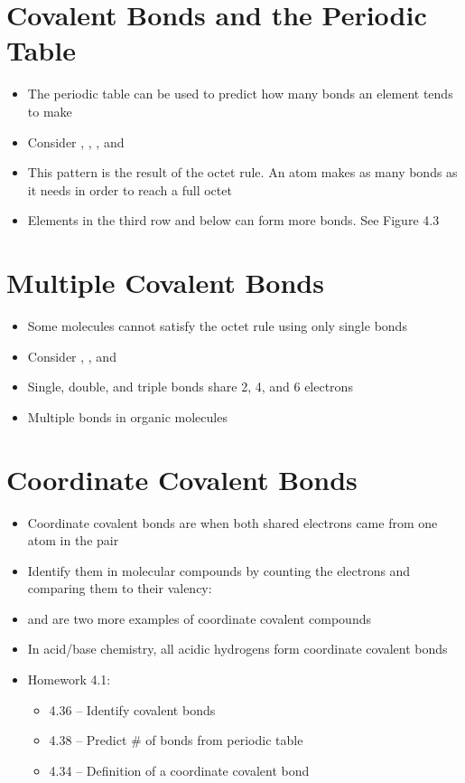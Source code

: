 \documentclass[12pt, openany, letterpaper]{memoir}
\begin{document}
\section{Covalent Bonds and the Periodic Table}
\begin{itemize}
	\item The periodic table can be used to predict how many bonds an element tends to make
	\item Consider , , , and 
	\item This pattern is the result of the octet rule. An atom makes as many bonds as it needs in order to reach a full octet
	\item Elements in the third row and below can form more bonds. See Figure 4.3	
\end{itemize}
\section{Multiple Covalent Bonds}
\begin{itemize}
	\item Some molecules cannot satisfy the octet rule using only single bonds
	\item Consider , , and 
	\item Single, double, and triple bonds share 2, 4, and 6 electrons
	\item Multiple bonds in organic molecules
\end{itemize}
\section{Coordinate Covalent Bonds}
\begin{itemize}
	\item Coordinate covalent bonds are when both shared electrons came from one atom in the pair
	\item Identify them in molecular compounds by counting the electrons and comparing them to their valency: 
	\item {} and  are two more examples of coordinate covalent compounds
	\item In acid/base chemistry, all acidic hydrogens form coordinate covalent bonds
	\item Homework 4.1:
	\begin{itemize}
		\item 4.36 -- Identify covalent bonds
		\item 4.38 -- Predict \# of bonds from periodic table
		\item 4.34 -- Definition of a coordinate covalent bond
	\end{itemize}	
\end{itemize}
\end{document}
